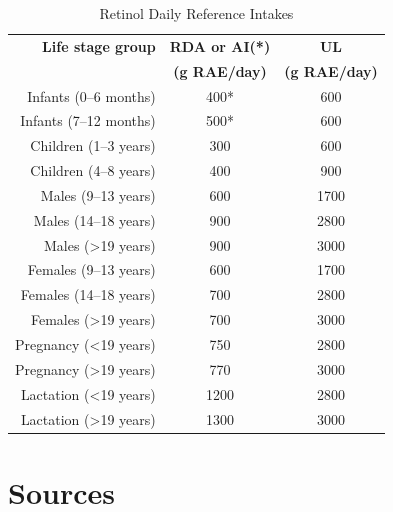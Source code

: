 \documentclass{book}
\begin{document}
\begin{sloppypar}
\begin{table}[ht]
	\caption{Retinol Daily Reference Intakes}
	\centering \begin{tabular}{| r | c | c |}
		\hline
		\textbf{Life stage group}			& \textbf{RDA or AI(*)}			& \textbf{UL}					\\
											& \textbf{(\textmu g RAE/day)}	& \textbf{(\textmu g RAE/day)}	\\ \hline
		Infants (0--6 months)				& 400*							& 600							\\ \hline
		Infants (7--12 months)				& 500*							& 600							\\ \hline
		Children (1--3 years)				& 300							& 600							\\ \hline
		Children (4--8 years)				& 400							& 900							\\ \hline
		Males (9--13 years)					& 600							& 1700							\\ \hline
		Males (14--18 years)				& 900							& 2800							\\ \hline
		Males (\textgreater19 years)		& 900							& 3000							\\ \hline
		Females (9--13 years)				& 600							& 1700							\\ \hline
		Females (14--18 years)				& 700							& 2800							\\ \hline
		Females (\textgreater19 years)		& 700							& 3000							\\ \hline
		Pregnancy (\textless19 years)		& 750							& 2800							\\ \hline
		Pregnancy (\textgreater19 years)	& 770							& 3000							\\ \hline
		Lactation (\textless19 years)		& 1200							& 2800							\\ \hline
		Lactation (\textgreater19 years)	& 1300							& 3000							\\ \hline
	\end{tabular}
\end{table}
\newpage

\section{Sources}



\end{sloppypar}
\end{document}
